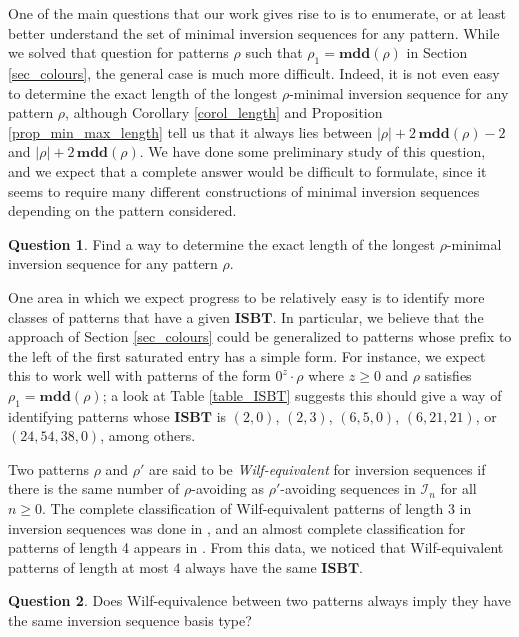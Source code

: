 \documentclass[a4paper,11pt]{article}
\theoremstyle{definition}
\newtheorem{question}{Question}
\theoremstyle{remark}
\newcommand{\I}{\mathcal{I}}
\newcommand{\mdd}{\mathbf{mdd}}
\newcommand{\ISBT}{\mathbf{ISBT}}
\begin{document}
One of the main questions that our work gives rise to is to enumerate, or at least better understand the set of minimal inversion sequences for any pattern. While we solved that question for patterns $\rho$ such that $\rho_1 = \mdd(\rho)$ in Section \ref{sec_colours}, the general case is much more difficult. Indeed, it is not even easy to determine the exact length of the longest $\rho$-minimal inversion sequence for any pattern $\rho$, although Corollary \ref{corol_length} and Proposition \ref{prop_min_max_length} tell us that it always lies between $|\rho| + 2 \, \mdd(\rho) -2$ and $|\rho| + 2 \, \mdd(\rho)$. We have done some preliminary study of this question, and we expect that a complete answer would be difficult to formulate, since it seems to require many different constructions of minimal inversion sequences depending on the pattern considered.
\begin{question}
    Find a way to determine the exact length of the longest $\rho$-minimal inversion sequence for any pattern $\rho$.
\end{question}

One area in which we expect progress to be relatively easy is to identify more classes of patterns that have a given $\ISBT$. In particular, we believe that the approach of Section \ref{sec_colours} could be generalized to patterns whose prefix to the left of the first saturated entry has a simple form. For instance, we expect this to work well with patterns of the form $0^z \cdot \rho$ where $z \geq 0$ and $\rho$ satisfies $\rho_1 = \mdd(\rho)$; a look at Table \ref{table_ISBT} suggests this should give a way of identifying patterns whose $\ISBT$ is $(2,0)$, $(2,3)$, $(6,5,0)$, $(6,21,21)$, or $(24, 54, 38, 0)$, among others.

Two patterns $\rho$ and $\rho'$ are said to be \emph{Wilf-equivalent} for inversion sequences if there is the same number of $\rho$-avoiding as $\rho'$-avoiding sequences in $\I_n$ for all $n \geq 0$. The complete classification of Wilf-equivalent patterns of length 3 in inversion sequences was done in \cite{Corteel_Martinez_Savage_Weselcouch_2016}, and an almost complete classification for patterns of length 4 appears in \cite{Hong_Li_2022}. From this data, we noticed that Wilf-equivalent patterns of length at most $4$ always have the same $\ISBT$.
\begin{question}
    Does Wilf-equivalence between two patterns always imply they have the same inversion sequence basis type?
\end{question}
\end{document}
